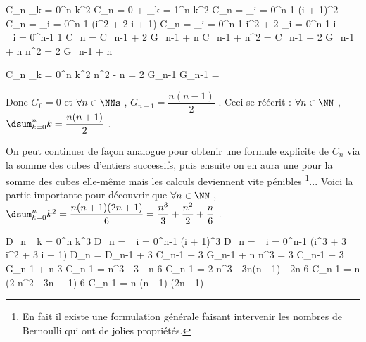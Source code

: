 \medskip

\begin{stepcalc}[style = sar, ope = \iff]
	C_n \eq[def]  \dsum_{k = 0}^{n} k^2
		\explnext{}
	C_n = 0 + \dsum_{k = 1}^{n} k^2
	C_n = \dsum_{i = 0}^{n-1} (i + 1)^2
		\explnext{}
	C_n = \dsum_{i = 0}^{n-1} (i^2 + 2 i + 1)
		\explnext{}
	C_n = \dsum_{i = 0}^{n-1} i^2 + 2 \dsum_{i = 0}^{n-1} i + \dsum_{i = 0}^{n-1} 1
		\explnext{}
	C_n = C_{n-1} + 2 G_{n-1} + n
	C_{n-1} + n^2 = C_{n-1} + 2 G_{n-1} + n
		\explnext{}
	n^2 = 2 G_{n-1} + n
\end{stepcalc}


\begin{stepcalc}[style = sar, ope = \iff]
	C_n \eq[def]  \dsum_{k = 0}^{n} k^2
		\explnext{}
	n^2 - n = 2 G_{n-1}
		\explnext{}
	G_{n-1} = 
\end{stepcalc}

\bigskip

Donc $G_0 = 0$ et $\forall n \in \NNs$ , $G_{n-1} = \dfrac{n(n - 1)}{2}$ .
Ceci se réécrit :
$\forall n \in \NN$ , $\dsum_{k = 0}^{n} k = \dfrac{n(n + 1)}{2}$ .

\medskip

On peut continuer de façon analogue pour obtenir une formule explicite de $C_n$ via la somme des cubes d'entiers successifs, puis ensuite on en aura une pour la somme des cubes elle-même mais les calculs deviennent vite pénibles
\footnote{
	En fait il existe une formulation générale faisant intervenir les nombres de Bernoulli qui ont de jolies propriétés.
}...
Voici la partie importante pour découvrir que 
$\forall n \in \NN$ , $\dsum_{k = 0}^{n} k^2 = \dfrac{n (n + 1) (2n + 1)}{6} = \dfrac{n^3}{3} + \dfrac{n^2}{2} + \dfrac{n}{6}$ .

\medskip

\begin{stepcalc}[style = sar, ope = \iff]
	D_n \eq[def]  \dsum_{k = 0}^{n} k^3
		\explnext{}
	D_n = \dsum_{i = 0}^{n-1} (i + 1)^3
		\explnext{}
	D_n = \dsum_{i = 0}^{n-1} (i^3 + 3 i^2 + 3 i + 1)
		\explnext{}
	D_n = D_{n-1} + 3 C_{n-1} + 3 G_{n-1} + n
		\explnext{}
	n^3 = 3 C_{n-1} + 3 G_{n-1} + n
		\explnext{}
	3 C_{n-1} = n^3 - 3 \cdot {} - n
		\explnext{}
	6 C_{n-1} = 2 n^3 - 3n(n - 1) - 2n
		\explnext{}
	6 C_{n-1} = n (2 n^2 - 3n + 1)
	6 C_{n-1} = n (n - 1) (2n - 1)
\end{stepcalc}


